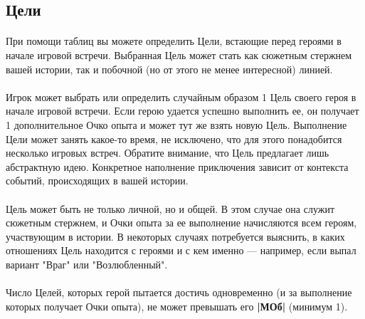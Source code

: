 \subsection{Цели}
\paragraph{}
При помощи таблиц вы можете определить Цели, встающие перед героями в начале игровой встречи. Выбранная Цель может стать как сюжетным стержнем вашей истории, так и побочной (но от этого не менее интересной) линией.
\paragraph{}
Игрок может выбрать или определить случайным образом 1 Цель своего героя в начале игровой встречи. Если герою удается успешно выполнить ее, он получает 1 дополнительное Очко опыта и может тут же взять новую Цель. Выполнение Цели может занять какое-то время, не исключено, что для этого понадобится несколько игровых встреч. Обратите внимание, что Цель предлагает лишь абстрактную идею. Конкретное наполнение приключения зависит от контекста событий, происходящих в вашей истории.
\paragraph{}
Цель может быть не только личной, но и общей. В этом случае она служит сюжетным стержнем, и Очки опыта за ее выполнение начисляются всем героям, участвующим в истории. В некоторых случаях потребуется выяснить, в каких отношениях Цель находится с героями и с кем именно — например, если выпал вариант "Враг" или "Возлюбленный".
\paragraph{}
Число Целей, которых герой пытается достичь одновременно (и за выполнение которых получает Очки опыта), не может превышать его \textbf{|МОб|} (минимум 1).
